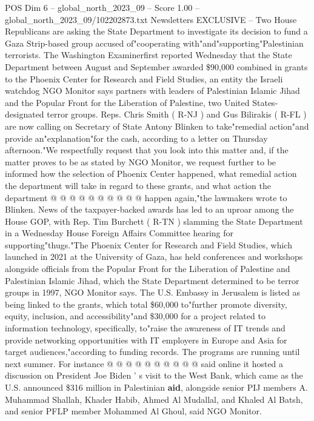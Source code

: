 \begin{textsample}{POS Dim 6 – global\_north\_2023\_09 – Score 1.00 – global\_north\_2023\_09/102202873.txt}  \label{ex:f6_pos_107}
Newsletters EXCLUSIVE -- Two House Republicans are asking the State Department to investigate its decision to fund a Gaza Strip-based group accused of"cooperating with"and"supporting"Palestinian terrorists.
The Washington Examinerfirst reported Wednesday that the State Department between August and September awarded \$90,000 combined in grants to the Phoenix Center for Research and Field Studies, an entity the Israeli watchdog NGO Monitor says partners with leaders of Palestinian Islamic Jihad and the Popular Front for the Liberation of Palestine, two United States-designated terror groups.
Reps.
Chris Smith ( R-NJ ) and Gus Bilirakis ( R-FL ) are now calling on Secretary of State Antony Blinken to take"remedial action"and provide an"explanation"for the cash, according to a letter on Thursday afternoon."We respectfully request that you look into this matter and, if the matter proves to be as stated by NGO Monitor, we request further to be informed how the selection of Phoenix Center happened, what remedial action the department will take in regard to these grants, and what action the department @ @ @ @ @ @ @ @ @ @ happen again,"the lawmakers wrote to Blinken.
News of the taxpayer-backed awards has led to an uproar among the House GOP, with Rep.
Tim Burchett ( R-TN ) slamming the State Department in a Wednesday House Foreign Affairs Committee hearing for supporting"thugs."The Phoenix Center for Research and Field Studies, which launched in 2021 at the University of Gaza, has held conferences and workshops alongside officials from the Popular Front for the Liberation of Palestine and Palestinian Islamic Jihad, which the State Department determined to be terror groups in 1997, NGO Monitor says.
The U.S.
Embassy in Jerusalem is listed as being linked to the grants, which total \$60,000 to"further promote diversity, equity, inclusion, and accessibility"and \$30,000 for a project related to information technology, specifically, to"raise the awareness of IT trends and provide networking opportunities with IT employers in Europe and Asia for target audiences,"according to funding records.
The programs are running until next summer.
For instance @ @ @ @ @ @ @ @ @ @ said online it hosted a discussion on President Joe Biden ' s visit to the West Bank, which came as the U.S. announced \$316 million in Palestinian \textbf{aid}, alongside senior PIJ members A.
Muhammad Shallah, Khader Habib, Ahmed Al Mudallal, and Khaled Al Batsh, and senior PFLP member Mohammed Al Ghoul, said NGO Monitor.

\end{textsample}
